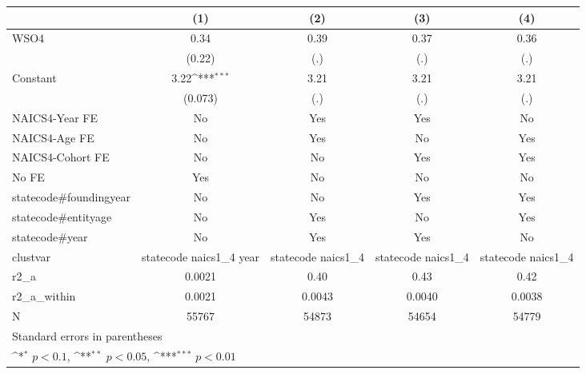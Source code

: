 {
\def\sym#1{\ifmmode^{#1}\else\(^{#1}\)\fi}
\begin{tabular}{l*{4}{c}}
\hline\hline
                    &\multicolumn{1}{c}{(1)}         &\multicolumn{1}{c}{(2)}         &\multicolumn{1}{c}{(3)}         &\multicolumn{1}{c}{(4)}         \\
\hline
WSO4                &        0.34         &        0.39         &        0.37         &        0.36         \\
                    &      (0.22)         &         (.)         &         (.)         &         (.)         \\
[1em]
Constant            &        3.22\sym{***}&        3.21         &        3.21         &        3.21         \\
                    &     (0.073)         &         (.)         &         (.)         &         (.)         \\
[1em]
NAICS4-Year FE      &          No         &         Yes         &         Yes         &          No         \\
[1em]
NAICS4-Age FE       &          No         &         Yes         &          No         &         Yes         \\
[1em]
NAICS4-Cohort FE    &          No         &          No         &         Yes         &         Yes         \\
[1em]
No FE               &         Yes         &          No         &          No         &          No         \\
[1em]
statecode#foundingyear&          No         &          No         &         Yes         &         Yes         \\
[1em]
statecode#entityage &          No         &         Yes         &          No         &         Yes         \\
[1em]
statecode#year      &          No         &         Yes         &         Yes         &          No         \\
\hline
clustvar            &statecode naics1\_4 year         &statecode naics1\_4         &statecode naics1\_4         &statecode naics1\_4         \\
r2\_a                &      0.0021         &        0.40         &        0.43         &        0.42         \\
r2\_a\_within         &      0.0021         &      0.0043         &      0.0040         &      0.0038         \\
N                   &       55767         &       54873         &       54654         &       54779         \\
\hline\hline
\multicolumn{5}{l}{\footnotesize Standard errors in parentheses}\\
\multicolumn{5}{l}{\footnotesize \sym{*} \(p<0.1\), \sym{**} \(p<0.05\), \sym{***} \(p<0.01\)}\\
\end{tabular}
}
